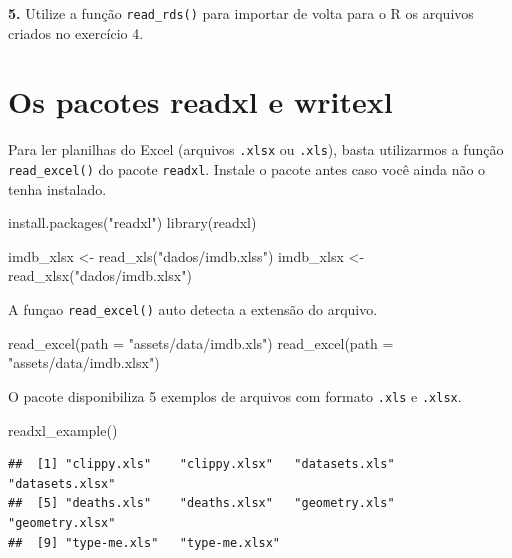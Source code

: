 \documentclass[
]{book}
\newenvironment{Shaded}{\begin{snugshade}}{\end{snugshade}}
\newcommand{\AttributeTok}[1]{\textcolor[rgb]{0.77,0.63,0.00}{#1}}
\newcommand{\FunctionTok}[1]{\textcolor[rgb]{0.00,0.00,0.00}{#1}}
\newcommand{\NormalTok}[1]{#1}
\newcommand{\OtherTok}[1]{\textcolor[rgb]{0.56,0.35,0.01}{#1}}
\newcommand{\StringTok}[1]{\textcolor[rgb]{0.31,0.60,0.02}{#1}}
\begin{document}
\textbf{5.} Utilize a função \texttt{read\_rds()} para importar de volta para o R os arquivos criados no exercício 4.

\hypertarget{readxl}{%
\section{Os pacotes readxl e writexl}\label{readxl}}

Para ler planilhas do Excel (arquivos \texttt{.xlsx} ou \texttt{.xls}), basta utilizarmos a função \texttt{read\_excel()} do pacote \texttt{readxl}. Instale o pacote antes caso você ainda não o tenha instalado.

\begin{Shaded}
\begin{Highlighting}[]
\FunctionTok{install.packages}\NormalTok{(}\StringTok{"readxl"}\NormalTok{)}
\FunctionTok{library}\NormalTok{(readxl)}

\NormalTok{imdb\_xlsx }\OtherTok{\textless{}{-}} \FunctionTok{read\_xls}\NormalTok{(}\StringTok{"dados/imdb.xlss"}\NormalTok{)}
\NormalTok{imdb\_xlsx }\OtherTok{\textless{}{-}} \FunctionTok{read\_xlsx}\NormalTok{(}\StringTok{"dados/imdb.xlsx"}\NormalTok{)}
\end{Highlighting}
\end{Shaded}

A funçao \texttt{read\_excel()} auto detecta a extensão do arquivo.

\begin{Shaded}
\begin{Highlighting}[]
\FunctionTok{read\_excel}\NormalTok{(}\AttributeTok{path =} \StringTok{"assets/data/imdb.xls"}\NormalTok{)}
\FunctionTok{read\_excel}\NormalTok{(}\AttributeTok{path =} \StringTok{"assets/data/imdb.xlsx"}\NormalTok{)}
\end{Highlighting}
\end{Shaded}

O pacote disponibiliza 5 exemplos de arquivos com formato \texttt{.xls} e \texttt{.xlsx}.

\begin{Shaded}
\begin{Highlighting}[]
\FunctionTok{readxl\_example}\NormalTok{()}
\end{Highlighting}
\end{Shaded}

\begin{verbatim}
##  [1] "clippy.xls"    "clippy.xlsx"   "datasets.xls"  "datasets.xlsx"
##  [5] "deaths.xls"    "deaths.xlsx"   "geometry.xls"  "geometry.xlsx"
##  [9] "type-me.xls"   "type-me.xlsx"
\end{verbatim}
\end{document}
